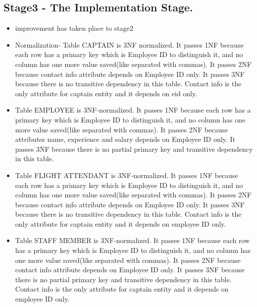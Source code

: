 \documentclass[10pt,conference]{IEEEtran}
\begin{document}
\newpage\subsection{Stage3 - The Implementation Stage. }\label{sec: 3 The Implementation Stage.}

\begin{itemize} \item{
improvement has taken place to stage2} \end{itemize}




\newpage\begin{itemize} \item{Normalization- Table CAPTAIN is 3NF normalized. It passes 1NF because each row has a primary key which is Employee ID to distinguish it, and no column has one more value saved(like separated with commas). It passes 2NF because contact info attribute depends on Employee ID only. It passes 3NF because there is no transitive dependency in this table. Contact info is the only attribute for captain entity and it depends on eid only.} \end{itemize}

\begin{itemize} \item{Table EMPLOYEE is 3NF-normalized. It passes 1NF because each row has a primary key which is Employee ID to distinguish it, and no column has one more value saved(like separated with commas). It passes 2NF because attributes name, experience and salary depends on Employee ID only. It passes 3NF because there is no partial primary key and transitive dependency in this table.} \end{itemize}

\begin{itemize} \item{Table FLIGHT ATTENDANT is 3NF-normalized. It passes 1NF because each row has a primary key which is Employee ID to distinguish it, and no column has one more value saved(like separated with commas). It passes 2NF because contact info attribute depends on Employee ID only. It passes 3NF because there is no transitive dependency in this table. Contact info is the only attribute for captain entity and it depends on employee ID only.
} \end{itemize}

\begin{itemize} \item{Table STAFF MEMBER is 3NF-normalized. It passes 1NF because each row has a primary key which is Employee ID to distinguish it, and no column has one more value saved(like separated with commas). It passes 2NF because contact info attribute depends on Employee ID only. It passes 3NF because there is no partial primary key and transitive dependency in this table. Contact info is the only attribute for captain entity and it depends on employee ID only.
} \end{itemize}
\end{document}
